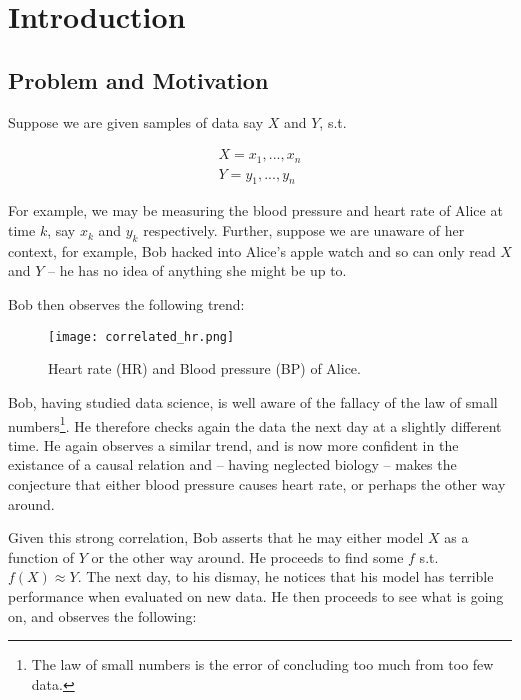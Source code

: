 
\chapter{Introduction}

\section{Problem and Motivation}

Suppose we are given samples of data say $X$ and $Y$, s.t.

\begin{align*}
    X = x_1, ..., x_n  \\
    Y = y_1, ..., y_n 
\end{align*}

For example, we may be measuring the blood pressure and heart rate of Alice at time $k$, 
say $x_k$ and $y_k$ respectively. Further, suppose we are unaware of her context, for example,
Bob hacked into Alice's apple watch and so can only read $X$ and $Y$ -- he has no idea of 
anything she might be up to.

Bob then observes the following trend:

\begin{figure}[H]
    \centering
    \texttt{[image: correlated\_hr.png]}
    \caption{Heart rate (HR) and Blood pressure (BP) of Alice.}
\end{figure}

Bob, having studied data science, is well aware of the fallacy of the law of small numbers\footnote{
    The law of small numbers is the error of concluding too much from too few data. 
}. He therefore checks again the data the next day at a slightly different time. He again observes 
a similar trend, and is now more confident in the existance of a causal relation and -- having neglected biology -- 
makes the conjecture that either blood pressure causes heart rate, or 
perhaps the other way around. 

Given this strong correlation, Bob asserts that he may either model $X$ as a function of $Y$ or the other way 
around. He proceeds to find some $f$ s.t. $f(X) \approx Y$. The next day, to his dismay, he notices that his
model has terrible performance when evaluated on new data. He then proceeds to see what is going on, and 
observes the following:

